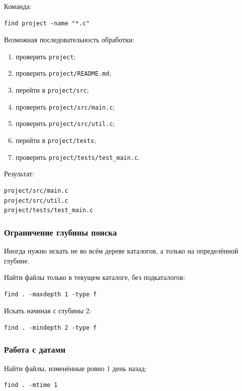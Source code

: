\documentclass[12pt,a4paper]{article}
\begin{document}
Команда:

\begin{verbatim}
find project -name "*.c"
\end{verbatim}

Возможная последовательность обработки:

\begin{enumerate}
    \item проверить \texttt{project};
    \item проверить \texttt{project/README.md};
    \item перейти в \texttt{project/src};
    \item проверить \texttt{project/src/main.c};
    \item проверить \texttt{project/src/util.c};
    \item перейти в \texttt{project/tests};
    \item проверить \texttt{project/tests/test\_main.c}.
\end{enumerate}

Результат:

\begin{verbatim}
project/src/main.c
project/src/util.c
project/tests/test_main.c
\end{verbatim}

\subsubsection{Ограничение глубины поиска}

Иногда нужно искать не во всём дереве каталогов, а только на определённой глубине.

Найти файлы только в текущем каталоге, без подкаталогов:

\begin{verbatim}
find . -maxdepth 1 -type f
\end{verbatim}

Искать начиная с глубины 2:

\begin{verbatim}
find . -mindepth 2 -type f
\end{verbatim}

\subsubsection{Работа с датами}

Найти файлы, изменённые ровно 1 день назад:

\begin{verbatim}
find . -mtime 1
\end{verbatim}
\end{document}
